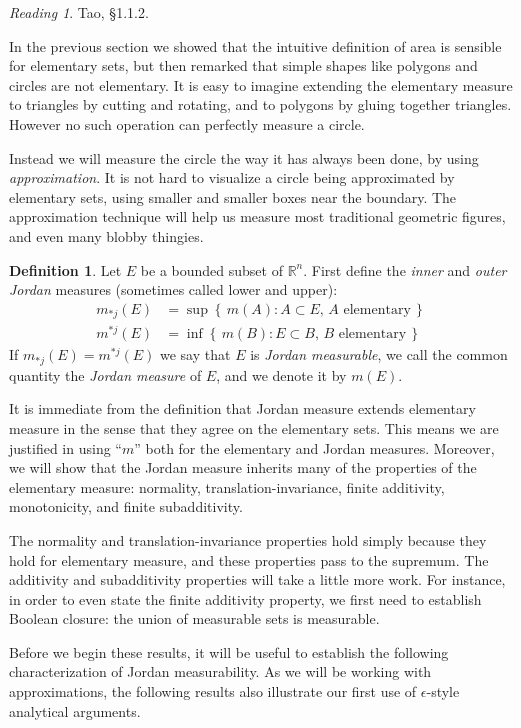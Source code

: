 \documentclass[11pt,oneside]{amsbook}
\newcommand{\set}[1]{\left\{\,#1\,\right\}}
\newcommand{\RR}{{\mathbb R}}
\theoremstyle{definition}
\theoremstyle{plain}
\theoremstyle{definition}
\newtheorem{defn}[thm]{Definition}
\theoremstyle{remark}
\newtheorem*{reading}{Reading}
\numberwithin{equation}{section}
\numberwithin{figure}{section}
\begin{document}
\begin{reading}
  Tao, \S1.1.2.
\end{reading}

In the previous section we showed that the intuitive definition of area is sensible for elementary sets, but then remarked that simple shapes like polygons and circles are not elementary. It is easy to imagine extending the elementary measure to triangles by cutting and rotating, and to polygons by gluing together triangles. However no such operation can perfectly measure a circle.

Instead we will measure the circle the way it has always been done, by using \emph{approximation}. It is not hard to visualize a circle being approximated by elementary sets, using smaller and smaller boxes near the boundary. The approximation technique will help us measure most traditional geometric figures, and even many blobby thingies.

\begin{defn}
  Let $E$ be a bounded subset of $\RR^n$. First define the \emph{inner} and \emph{outer Jordan} measures (sometimes called lower and upper):
  \begin{align*}
    m_{*j}(E)&=\sup\set{m(A):A\subset E,\, A\text{ elementary}}\\
    m^{*j}(E)&=\inf\set{m(B):E\subset B,\, B\text{ elementary}}
  \end{align*}
  If $m_{*j}(E)=m^{*j}(E)$ we say that $E$ is \emph{Jordan measurable}, we call the common quantity the \emph{Jordan measure} of $E$, and we denote it by $m(E)$.
\end{defn}

It is immediate from the definition that Jordan measure extends elementary measure in the sense that they agree on the elementary sets. This means we are justified in using ``$m$'' both for the elementary and Jordan measures. Moreover, we will show that the Jordan measure inherits many of the properties of the elementary measure: normality, translation-invariance, finite additivity, monotonicity, and finite subadditivity.

The normality and translation-invariance properties hold simply because they hold for elementary measure, and these properties pass to the supremum. The additivity and subadditivity properties will take a little more work. For instance, in order to even state the finite additivity property, we first need to establish Boolean closure: the union of measurable sets is measurable.

Before we begin these results, it will be useful to establish the following characterization of Jordan measurability. As we will be working with approximations, the following results also illustrate our first use of $\epsilon$-style analytical arguments.
\end{document}
